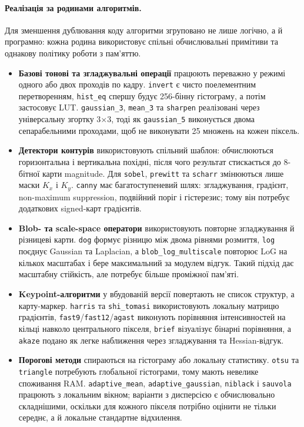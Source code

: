 \documentclass[a4paper,12pt]{article}
\begin{document}
\paragraph{Реалізація за родинами алгоритмів.}
Для зменшення дублювання коду алгоритми згруповано не лише логічно, а й програмно: кожна родина використовує спільні обчислювальні примітиви та однакову політику роботи з пам'яттю.
\begin{itemize}
	\item \textbf{Базові тонові та згладжувальні операції} працюють переважно у режимі одного або двох проходів по кадру. \texttt{invert} є чисто поелементним перетворенням, \texttt{hist\_eq} спершу будує 256-бінну гістограму, а потім застосовує LUT. \texttt{gaussian\_3}, \texttt{mean\_3} та \texttt{sharpen} реалізовані через універсальну згортку 3$\times$3, тоді як \texttt{gaussian\_5} виконується двома сепарабельними проходами, щоб не виконувати 25 множень на кожен піксель.
	\item \textbf{Детектори контурів} використовують спільний шаблон: обчислюються горизонтальна і вертикальна похідні, після чого результат стискається до 8-бітної карти magnitude. Для \texttt{sobel}, \texttt{prewitt} та \texttt{scharr} змінюються лише маски \(K_x\) і \(K_y\). \texttt{canny} має багатоступеневий шлях: згладжування, градієнт, non-maximum suppression, подвійний поріг і гістерезис; тому він потребує додаткових signed-карт градієнтів.
	\item \textbf{Blob- та scale-space оператори} використовують повторне згладжування й різницеві карти. \texttt{dog} формує різницю між двома рівнями розмиття, \texttt{log} поєднує Gaussian та Laplacian, а \texttt{blob\_log\_multiscale} повторює LoG на кількох масштабах і бере максимальний за модулем відгук. Такий підхід дає масштабну стійкість, але потребує більше проміжної пам'яті.
	\item \textbf{Keypoint-алгоритми} у вбудованій версії повертають не список структур, а карту-маркер. \texttt{harris} та \texttt{shi\_tomasi} використовують локальну матрицю градієнтів, \texttt{fast9}/\texttt{fast12}/\texttt{agast} виконують порівняння інтенсивностей на кільці навколо центрального пікселя, \texttt{brief} візуалізує бінарні порівняння, а \texttt{akaze} подано як легке наближення через згладжування та Hessian-відгук.
	\item \textbf{Порогові методи} спираються на гістограму або локальну статистику. \texttt{otsu} та \texttt{triangle} потребують глобальної гістограми, тому мають невелике споживання RAM. \texttt{adaptive\_mean}, \texttt{adaptive\_gaussian}, \texttt{niblack} і \texttt{sauvola} працюють з локальним вікном; варіанти з дисперсією є обчислювально складнішими, оскільки для кожного пікселя потрібно оцінити не тільки середнє, а й локальне стандартне відхилення.

\end{itemize}
\end{document}
